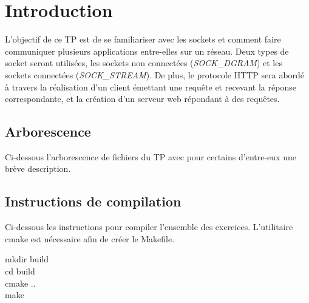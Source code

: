 \section{Introduction}
L'objectif de ce TP est de se familiariser avec les sockets et comment faire communiquer plusieurs applications entre-elles sur un réseau. Deux types de socket seront utilisées, les sockets non connectées (\emph{SOCK\_DGRAM}) et les sockets connectées (\emph{SOCK\_STREAM}). De plus, le protocole HTTP sera abordé à travers la réalisation d'un client émettant une requête et recevant la réponse correspondante, et la création d'un serveur web répondant à des requêtes.

\subsection{Arborescence}
\noindent Ci-dessous l'arborescence de fichiers du TP avec pour certains d'entre-eux une brève description.



\subsection{Instructions de compilation}
Ci-dessous les instructions pour compiler l'ensemble des exercices. L'utilitaire cmake est nécessaire afin de créer le Makefile. %

\begin{mdframed}[backgroundcolor=lightblue, linecolor=darkblue]
	mkdir build\\
	cd build\\
	cmake ..\\
	make
\end{mdframed}
